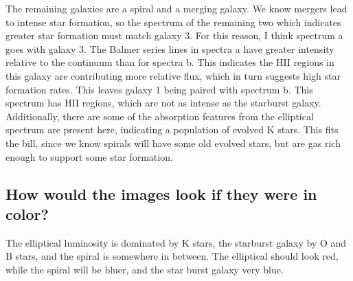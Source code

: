 \documentclass[12pt]{article}
\begin{document}
The remaining galaxies are a spiral and a merging galaxy. We know mergers lead to intense star formation, so the spectrum of the remaining two which indicates greater star formation must match galaxy 3. For this reason, I think spectrum a goes with galaxy 3. The Balmer series lines in spectra a have greater intensity relative to the continuum than for spectra b. This indicates the HII regions in this galaxy are contributing more relative flux, which in turn suggests high star formation rates. This leaves galaxy 1 being paired with spectrum b. This spectrum has HII regions, which are not as intense as the starburst galaxy. Additionally, there are some of the absorption features from the elliptical spectrum are present here, indicating a population of evolved K stars. This fits the bill, since we know spirals will have some old evolved stars, but are gas rich enough to support some star formation. 

\subsection{How would the images look if they were in color?}
The elliptical luminosity is dominated by K stars, the starburst galaxy by O and B stars, and the spiral is somewhere in between. The elliptical should look red, while the spiral will be bluer, and the star burst galaxy very blue.
\end{document}
